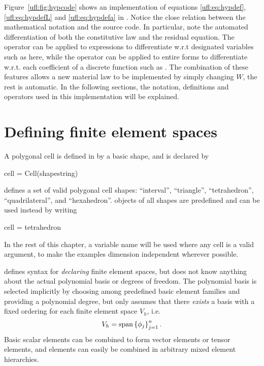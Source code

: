 Figure~\ref{ufl:fig:hypcode} shows an implementation of
equations \eqref{ufl:eq:hypdef}, \eqref{ufl:eq:hypdefL} and \eqref{ufl:eq:hypdefa}
in \ufl{}.  Notice the close relation between the
mathematical notation and the \ufl{} source code. In particular, note
the automated differentiation of both the constitutive law and the
residual equation. The operator  can be applied to
expressions to differentiate w.r.t designated variables such as
 here, while the operator  can be applied
to entire forms to differentiate w.r.t. each coefficient of a discrete
function such as .  The combination of these features allows
a new material law to be implemented by simply changing $W$, the rest
is automatic.  In the following sections, the notation, definitions
and operators used in this implementation will be explained.

\section{Defining finite element spaces} \label{ufl:sec:elements}
A polygonal cell is defined in \ufl{} by a basic shape, and is declared by
\begin{python}
cell = Cell(shapestring)
\end{python}
\ufl{} defines a set of valid polygonal cell shapes: ``interval'',
``triangle'', ``tetrahedron'', ``quadrilateral'', and ``hexahedron''.
 objects of all shapes are predefined and can be used
instead by writing
\begin{python}
cell = tetrahedron
\end{python}
In the rest of this chapter, a variable name  will be used
where any cell is a valid argument, to make the examples dimension
independent wherever possible.

\ufl{} defines syntax for \emph{declaring} finite element spaces, but
does not know anything about the actual polynomial basis or degrees of
freedom. The polynomial basis is selected implicitly by choosing among
predefined basic element families and providing a polynomial degree,
but \ufl{} only assumes that there \emph{exists} a basis with a fixed
ordering for each finite element space $V_h$, i.e.
\begin{align}
V_h = \operatorname{span}\left\{ \phi_j \right\}_{j=1}^{n}.
\end{align}
Basic scalar elements can be combined to form vector elements or
tensor elements, and elements can easily be combined in arbitrary
mixed element hierarchies.


